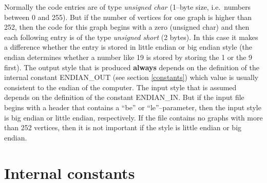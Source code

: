 \documentclass[a4paper]{article}
\begin{document}
\begin{description}
Normally the code entries are of type \textit{unsigned char} (1--byte size, 
i.e.~numbers between 0 and 255). But if the
number of vertices for one graph is higher than 252, then the code for this 
graph begins with a zero (unsigned char) and then each following entry is of
the type \textit{unsigned short} (2 bytes). In this case it makes a difference 
whether the entry is stored in little endian or big endian style (the endian 
determines whether a number like 19 is stored by storing the 1 or the 9 first).
The output style that is produced \textbf{always} depends on the definition
of the 
internal constant ENDIAN\_OUT (see section \ref{constants}) which value
is usually
consistent to the endian of the computer. The input style that is assumed 
depends
on the definition of the constant ENDIAN\_IN. But if the input file begins with
a header that contains a ``be'' or ``le''--parameter, then the input style is
big endian or little endian, respectively. If the file contains no graphs with
more than 252 vertices, then it is not important if the style is little endian
or big endian.
\end{description}
  
\section{\label{constants}Internal constants}
\end{document}
